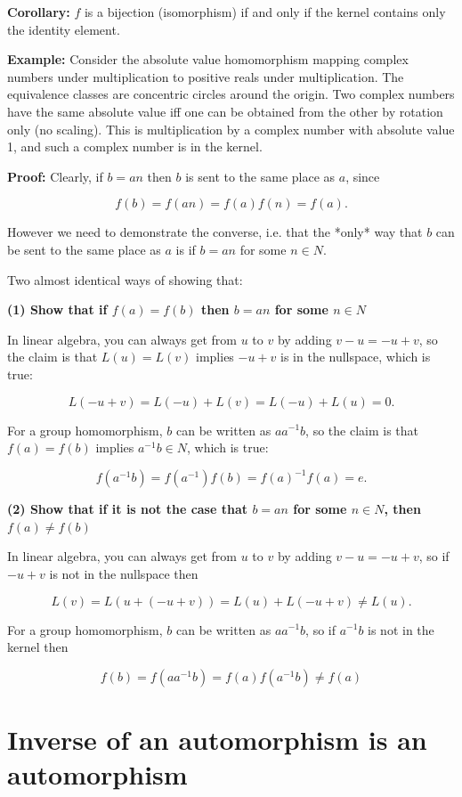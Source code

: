 \textbf{Corollary:} $f$ is a bijection (isomorphism) if and only if the kernel
contains only the identity element.

\textbf{Example:} Consider the absolute value homomorphism mapping complex numbers
under multiplication to positive reals under multiplication. The equivalence
classes are concentric circles around the origin. Two complex numbers have the
same absolute value iff one can be obtained from the other by rotation only (no
scaling). This is multiplication by a complex number with absolute value 1, and
such a complex number is in the kernel.

\textbf{Proof:} Clearly, if $b = an$ then $b$ is sent to the same place as $a$,
since

$$
f(b) = f(an) = f(a)f(n) = f(a).
$$

However we need to demonstrate the converse, i.e. that the *only* way that $b$
can be sent to the same place as $a$ is if $b=an$ for some $n \in N$.

Two almost identical ways of showing that:

\textbf{(1) Show that if $f(a) = f(b)$ then $b = an$ for some $n \in N$}

In linear algebra, you can always get from $u$ to $v$ by adding $v - u = -u +
v$, so the claim is that $L(u) = L(v)$ implies $-u + v$ is in the nullspace,
which is true:

$$
L(-u + v) = L(-u) + L(v) = L(-u) + L(u) = 0.
$$

For a group homomorphism, $b$ can be written as $aa^{-1}b$, so the claim is
that $f(a) = f(b)$ implies $a^{-1}b \in N$, which is true:

$$
f(a^{-1}b) = f(a^{-1})f(b) = f(a)^{-1}f(a) = e.
$$

\textbf{(2) Show that if it is not the case that $b = an$ for some $n \in N$, then $f(a) \neq f(b)$}

In linear algebra, you can always get from $u$ to $v$ by adding $v - u = -u + v$,
so if $-u + v$ is not in the nullspace then

$$
L(v) = L(u + (-u + v)) = L(u) + L(-u + v) \neq L(u).
$$

For a group homomorphism, $b$ can be written as $aa^{-1}b$, so if $a^{-1}b$ is
not in the kernel then

$$
f(b) = f(aa^{-1}b) = f(a)f(a^{-1}b) \neq f(a)
$$


\section{Inverse of an automorphism is an automorphism}

